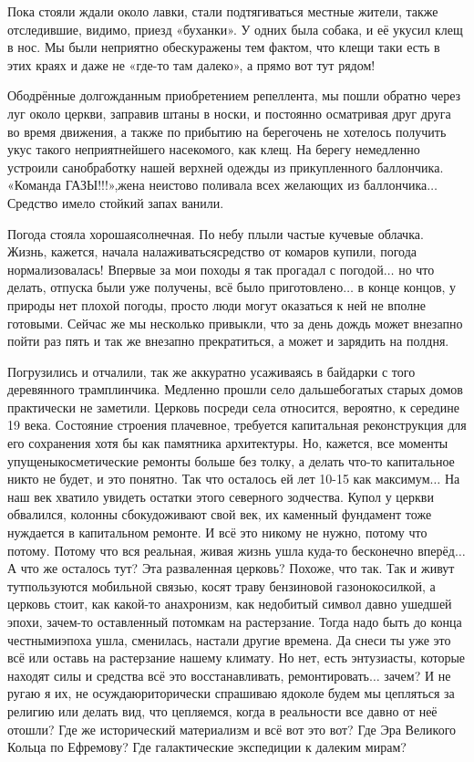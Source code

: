 Пока стояли ждали около лавки, стали подтягиваться местные жители, также отследившие, видимо, приезд «буханки». У одних была собака, и её укусил клещ в нос. Мы были неприятно обескуражены тем фактом, что клещи таки есть в этих краях и даже не «где-то там далеко», а прямо вот тут рядом!

Ободрённые долгожданным приобретением репеллента, мы пошли обратно через луг около церкви, заправив штаны в носки, и постоянно осматривая друг друга во время движения, а также по прибытию на берег\mdash очень не хотелось получить укус такого неприятнейшего насекомого, как клещ. На берегу немедленно устроили санобработку нашей верхней одежды из прикупленного баллончика. «Команда ГАЗЫ!!!»,\mdash жена неистово поливала всех желающих из баллончика$\ldots$ Средство имело стойкий запах ванили.

Погода стояла хорошая\mdash солнечная. По небу плыли частые кучевые облачка. Жизнь, кажется, начала налаживаться\mdash средство от комаров купили, погода нормализовалась! Впервые за мои походы я так прогадал с погодой$\ldots$ но что делать, отпуска были уже получены, всё было приготовлено$\ldots$ в конце концов, у природы нет плохой погоды, просто люди могут оказаться к ней не вполне готовыми. Сейчас же мы несколько привыкли, что за день дождь может внезапно пойти раз пять и так же внезапно прекратиться, а может и зарядить на полдня. 

Погрузились и отчалили, так же аккуратно усаживаясь в байдарки с того деревянного трамплинчика. Медленно прошли село дальше\mdash богатых старых домов практически не заметили. Церковь посреди села относится, вероятно, к середине 19 века. Состояние строения плачевное, требуется капитальная реконструкция для его сохранения хотя бы как памятника архитектуры. Но, кажется, все моменты упущены\mdash косметические ремонты больше без толку, а делать что-то капитальное никто не будет, и это понятно. Так что осталось ей лет 10-15 как максимум$\ldots$ На наш век хватило увидеть остатки этого северного зодчества. Купол у церкви обвалился, колонны сбоку\mdash доживают свой век, их каменный фундамент тоже нуждается в капитальном ремонте. И всё это никому не нужно, потому что потому. Потому что вся реальная, живая жизнь ушла куда-то бесконечно вперёд$\ldots$ А что же осталось тут? Эта разваленная церковь? Похоже, что так. Так и живут тут\mdash пользуются мобильной связью, косят траву бензиновой газонокосилкой, а церковь стоит, как какой-то анахронизм, как недобитый символ давно ушедшей эпохи, зачем-то оставленный потомкам на растерзание. Тогда надо быть до конца честными\mdash эпоха ушла, сменилась, настали другие времена. Да снеси ты уже это всё или оставь на растерзание нашему климату. Но нет, есть энтузиасты, которые находят силы и средства всё это восстанавливать, ремонтировать$\ldots$ зачем? И не ругаю я их, не осуждаю\mdash риторически спрашиваю я\mdash доколе будем мы цепляться за религию или делать вид, что цепляемся, когда в реальности все давно от неё отошли? Где же исторический материализм и всё вот это вот? Где Эра Великого Кольца по Ефремову? Где галактические экспедиции к далеким мирам?

